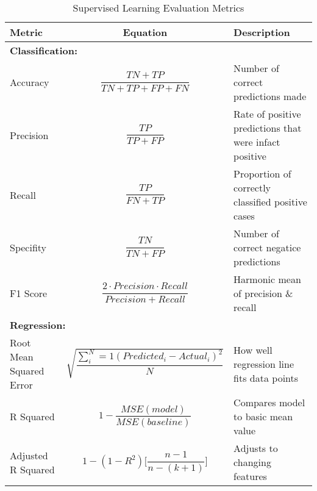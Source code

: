 \begin{landscape}
    \begin{table}[H]
        \centering
        \caption{Supervised Learning Evaluation Metrics}
        \label{table:Evaluation Metrics}
        \begin{tabular}{|l|c|l|}
            \hline
            \textbf{Metric}   & \textbf{Equation} & \textbf{Description} \\ \hline
            \multicolumn{3}{|l|}{\textbf{Classification:}} \\ \hline
            \multirow{2}{*}{Accuracy} &  \multirow{2}{*}{$\dfrac{TN+TP}{TN+TP+FP+FN}$   }    &  \multirow{2}{*}{Number of correct predictions made}           \\ 
            & & \\ \hline
            \multirow{2}{*}{Precision} &  \multirow{2}{*}{$\dfrac{TP}{TP+FP}$}    &  \multirow{2}{*}{Rate of positive predictions that were infact positive}           \\ 
            & & \\ \hline
            \multirow{2}{*}{Recall} &  \multirow{2}{*}{$\dfrac{TP}{FN+TP}$}    &  \multirow{2}{*}{Proportion of correctly classified positive cases }           \\ 
            & & \\ \hline
            \multirow{2}{*}{Specifity} &  \multirow{2}{*}{$\dfrac{TN}{TN+FP}$}    &  \multirow{2}{*}{Number of correct negatice predictions}           \\ 
            & & \\ \hline
            \multirow{2}{*}{F1 Score} &  \multirow{2}{*}{$\dfrac{2\cdot Precision \cdot Recall}{Precision + Recall}$}    &  \multirow{2}{*}{Harmonic mean of precision \& recall}           \\ 
            & & \\ \hline
            \multicolumn{3}{|l|}{\textbf{Regression:}} \\ \hline
            \multirow{3}{*}{Root Mean Squared Error} &  \multirow{3}{*}{$\sqrt{\dfrac{\sum^N_i=1(Predicted_i-Actual_i)^2}{N}}$}    &  \multirow{3}{*}{How well regression line fits data points}           \\ 
            & & \\ 
            & & \\ \hline
            \multirow{3}{*}{R Squared} &  \multirow{3}{*}{$1 - \dfrac{MSE(model)}{MSE(baseline)}$}    &  \multirow{3}{*}{Compares model to basic mean value}           \\ 
            & & \\
            & & \\ \hline
            \multirow{3}{*}{Adjusted R Squared} &  \multirow{3}{*}{$1-(1-R^2)\Bigg[\dfrac{n-1}{n-(k+1)}\Bigg]$}    &  \multirow{3}{*}{Adjusts to changing features}           \\ 
            & & \\
            & & \\ \hline
        \end{tabular}
    \end{table}
\end{landscape}
